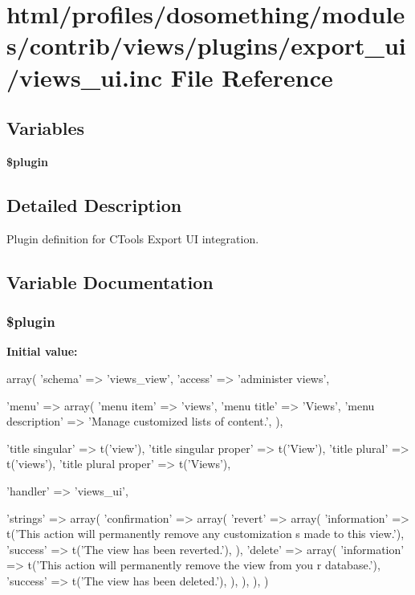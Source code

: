 \hypertarget{views__ui_8inc}{
\section{html/profiles/dosomething/modules/contrib/views/plugins/export\_\-ui/views\_\-ui.inc File Reference}
\label{views__ui_8inc}
}
\subsection*{Variables}
\begin{DoxyCompactItemize}
\item 
{\bfseries \$plugin}
\end{DoxyCompactItemize}


\subsection{Detailed Description}
Plugin definition for CTools Export UI integration. 

\subsection{Variable Documentation}
\hypertarget{views__ui_8inc_ada8a7130088351710bb02ed622d6bf65}{
\subsubsection[{\$plugin}]{\setlength{\rightskip}{0pt plus 5cm}\$plugin}}
\label{views__ui_8inc_ada8a7130088351710bb02ed622d6bf65}
{\bfseries Initial value:}
\begin{DoxyCode}
 array(
  'schema' => 'views_view',
  'access' => 'administer views',

  'menu' => array(
    'menu item' => 'views',
    'menu title' => 'Views',
    'menu description' => 'Manage customized lists of content.',
  ),

  'title singular' => t('view'),
  'title singular proper' => t('View'),
  'title plural' => t('views'),
  'title plural proper' => t('Views'),

  'handler' => 'views_ui',

  'strings' => array(
    'confirmation' => array(
      'revert' => array(
        'information' => t('This action will permanently remove any customization
      s made to this view.'),
        'success' => t('The view has been reverted.'),
      ),
      'delete' => array(
        'information' => t('This action will permanently remove the view from you
      r database.'),
        'success' => t('The view has been deleted.'),
      ),
    ),
  ),
)
\end{DoxyCode}
